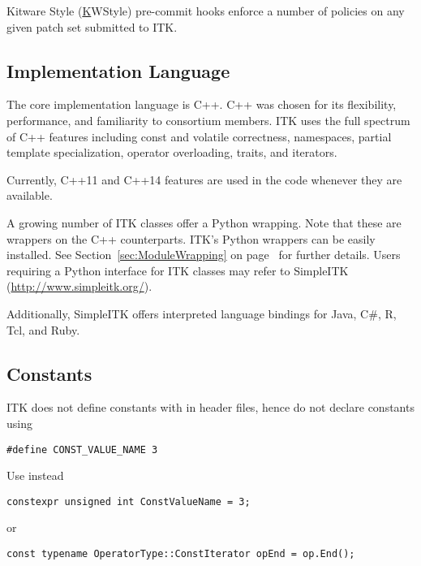 Kitware Style (\href{https://kitware.github.io/KWStyle/} KWStyle) pre-commit
hooks enforce a number of policies on any given patch set submitted to ITK.


\subsection{Implementation Language}
\label{subsec:ImplementationLanguage}

The core implementation language is C++. C++ was chosen for its flexibility,
performance, and familiarity to consortium members. ITK uses the full spectrum
of C++ features including const and volatile correctness, namespaces, partial
template specialization, operator overloading, traits, and iterators.

Currently, C++11 and C++14 features are used in the code whenever they are
available.

A growing number of ITK classes offer a Python wrapping. Note that these are
wrappers on the C++ counterparts. ITK's Python wrappers can be easily installed.
See Section~\ref{sec:ModuleWrapping} on page~\pageref{sec:ModuleWrapping} for
further details. Users requiring a Python interface for ITK classes may refer to
SimpleITK (\href{http://www.simpleitk.org/}{http://www.simpleitk.org/}).

Additionally, SimpleITK offers interpreted language bindings for Java, C\#, R,
Tcl, and Ruby.


\subsection{Constants}
\label{subsec:Constants}

ITK does not define constants with  in header files, hence do not
declare constants using
\small
\begin{verbatim}
#define CONST_VALUE_NAME 3
\end{verbatim}
\normalsize

Use instead

\small
\begin{verbatim}
constexpr unsigned int ConstValueName = 3;
\end{verbatim}
\normalsize

or

\small
\begin{verbatim}
const typename OperatorType::ConstIterator opEnd = op.End();
\end{verbatim}
\normalsize

